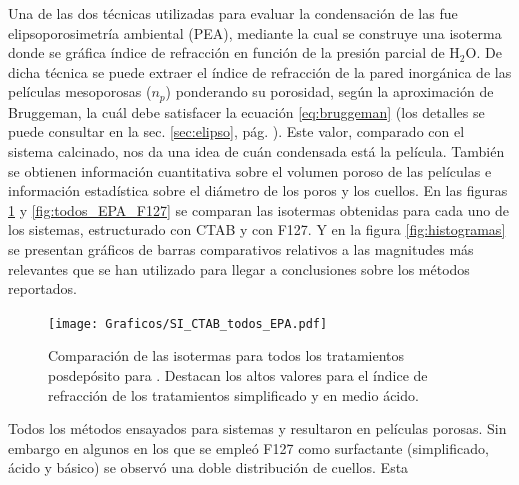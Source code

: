 		Una de las dos técnicas utilizadas para evaluar la condensación de las \pdm\space fue elipsoporosimetría ambiental (PEA), mediante la cual se construye una isoterma donde se gráfica índice de refracción en función de la presión parcial de H$_2$O. De dicha técnica se puede extraer el índice de refracción de la pared inorgánica de las películas mesoporosas ($n_p$) ponderando su porosidad, según la aproximación de Bruggeman, la cuál debe satisfacer la ecuación \ref{eq:bruggeman}\cite{violi2012} (los detalles se puede consultar en la sec. \ref{sec:elipso}, pág. \pageref{sec:elipso}). Este valor, comparado con el sistema calcinado, nos da una idea de cuán condensada está la película. También se obtienen información cuantitativa sobre el volumen poroso de las películas e información estadística sobre el diámetro de los poros y los cuellos. En las figuras \ref{fig:todos_EPA_CTAB} y \ref{fig:todos_EPA_F127} se comparan las isotermas obtenidas para cada uno de los sistemas, estructurado con CTAB y con F127. Y en la figura \ref{fig:histogramas} se presentan gráficos de barras comparativos relativos a las magnitudes más relevantes que se han utilizado para llegar a conclusiones sobre los métodos reportados.
			\begin{figure}[b!]
		 	   	   \begin{center}
		 	   	   \texttt{[image: Graficos/SI\_CTAB\_todos\_EPA.pdf]}
			   	   \caption[Comparación PEA tratamientos alternativos (CTAB)]{Comparación de las isotermas para todos los tratamientos posdepósito para \pdmC. Destacan los altos valores para el índice de refracción de los tratamientos simplificado y en medio ácido.}
				   \label{fig:todos_EPA_CTAB}	
				   \end{center}
				   \end{figure}
		
		Todos los métodos ensayados para sistemas \pdmF\space y \pdmC\space resultaron en películas porosas. Sin embargo en algunos en los que se empleó F127 como surfactante (simplificado, ácido y básico) se observó una doble distribución de cuellos. Esta
			
